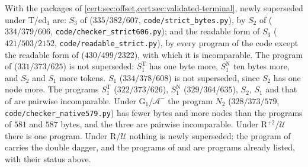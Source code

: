 With the packages of \cref{cert:sec:offset,cert:sec:validated-terminal}, newly
superseded under T/ed$_1$ are: $S_3$ of 
($335/382/607$, \texttt{code/strict\_bytes.py}), by $S_2$ of
 ($334/379/606$, \texttt{code/checker\_strict606.py}); and
the readable form of $S_3$ ($421/503/2152$, \texttt{code/readable\_strict.py}), by
every program of the code except the readable form of 
($430/499/2322$), with which it is incomparable. The program
of  ($331/373/625$) is not superseded: $S^{\mathrm T}_1$ has one
byte more, $S^{\mathrm N}_1$ ten bytes more, and $S_2$ and $S_1$ more tokens. $S_1$
($334/378/608$) is not superseded, since $S_2$ has one node more. The programs
$S^{\mathrm T}_1$ ($322/373/626$), $S^{\mathrm N}_1$ ($329/364/635$), $S_2$, $S_1$ and
that of  are pairwise incomparable. Under
G$_1$/$\mathcal A^{-}$ the program $N_2$ ($328/373/579$,
\texttt{code/checker\_native579.py}) has fewer bytes and more nodes than the
programs of $581$ and $587$ bytes, and the three are pairwise incomparable. Under
R$^{+2}$/$\mathcal U$ there is one program. Under R/$\mathcal U$ nothing is newly
superseded: the program of  carries the double
dagger, and the programs of  and 
are programs already listed, with their status above.

